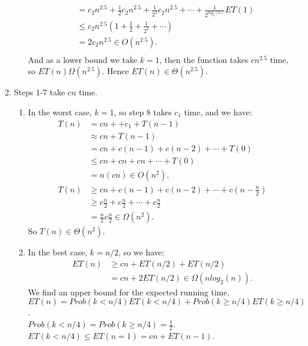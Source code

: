 \documentclass[10pt,oneside,reqno]{amsart}
\theoremstyle{plain}
\theoremstyle{definition}
\begin{document}
\begin{enumerate}[label=\arabic*.]
\begin{enumerate}
\begin{equation}
\begin{aligned}
&= c_2n^{2.5} + \frac{1}{2}c_2n^{2.5} + \frac{1}{2^2}c_2n^{2.5} + \cdots + \frac{1}{2^{log_2(n)}}ET(1)\\
&\leq c_2n^{2.5}\left(1 + \frac{1}{2} + \frac{1}{2^2} + \cdots \right)\\
&= 2c_2n^{2.5} \in O(n^{2.5}). \\
\end{aligned}
\end{equation}
And as a lower bound we take $k = 1$, then the function takes $cn^{2.5}$ time, so $ET(n) \Omega(n^{2.5})$. Hence $ET(n) \in \Theta(n^{2.5})$. \\
\end{enumerate}

\item Steps 1-7 take $cn$ time. 
\begin{enumerate}
\item In the worst case, $k = 1$, so step 8 takes $c_1$ time, and we have:
\begin{equation}
\begin{aligned}
T(n) &= cn + + c_1 + T(n - 1)\\
&\approx cn + T(n - 1)\\
&= cn + c(n - 1) + c(n - 2) + \cdots + T(0)\\
&\leq cn + cn + cn + \cdots + T(0)\\
&=n(cn) \in O(n^2),\\
T(n) &\geq cn + c(n - 1) + c(n - 2) + \cdots + c(n - \frac{n}{2})\\
&\geq c\frac{n}{2} + c\frac{n}{2}  + \cdots + c\frac{n}{2} \\
&= \frac{n}{2}c\frac{n}{2} \in \Omega(n^2). 
\end{aligned}
\end{equation}
So $T(n) \in \Theta(n^2)$. 
\item In the best case, $k = n/2$, so we have:
\begin{equation}
\begin{aligned}
ET(n) &\geq cn + ET(n/2) + ET(n/2)\\
&= cn + 2ET(n/2) \in \Omega(nlog_2(n)). 
\end{aligned}
\end{equation}
We find an upper bound for the expected running time. \\
$ET(n) = Prob(k < n/4)ET(k < n/4) + Prob(k \geq n/4)ET(k \geq n/4)$. \\
$Prob(k < n/4) = Prob(k \geq n/4) = \frac{1}{2}$. \\
$ET(k < n/4) \leq ET(n = 1) = cn + ET(n - 1)$. \\

\end{enumerate}
\end{enumerate}
\end{document}
